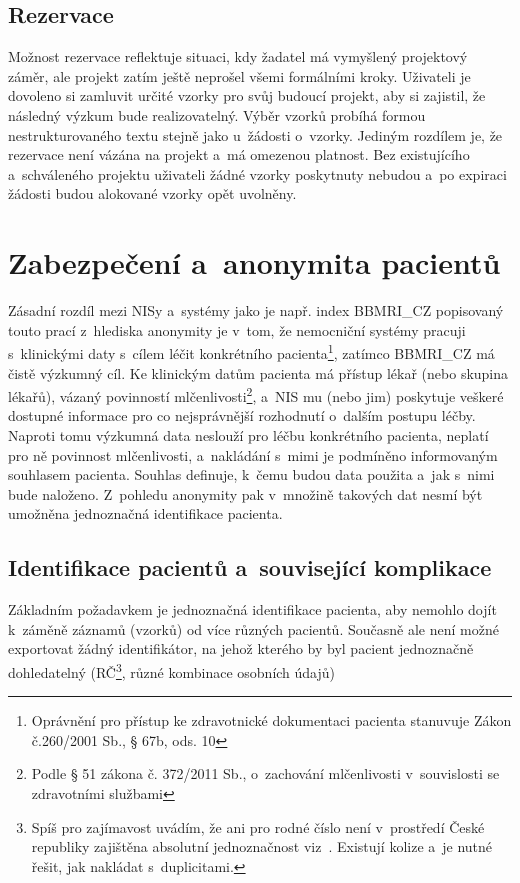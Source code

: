 \documentclass[11pt,draft,oneside]{fithesis2}
\newcommand{\ProjectName}{BBMRI\_CZ\xspace}
\begin{document}
\subsection{Rezervace}
Možnost rezervace reflektuje situaci, kdy žadatel má vymyšlený projektový záměr, ale projekt zatím ještě neprošel všemi formálními kroky. Uživateli je dovoleno si zamluvit určité vzorky pro svůj budoucí projekt, aby si zajistil, že následný výzkum bude realizovatelný. Výběr vzorků probíhá formou nestrukturovaného textu stejně jako u~žádosti o~vzorky. Jediným rozdílem je, že rezervace není vázána na projekt a~má omezenou platnost. Bez existujícího a~schváleného projektu uživateli žádné vzorky poskytnuty nebudou a~po expiraci žádosti budou alokované vzorky opět uvolněny.

\section{Zabezpečení a~anonymita pacientů}
Zásadní rozdíl mezi NISy a~systémy jako je např. index \ProjectName popisovaný touto prací z~hlediska anonymity je v~tom, že nemocniční systémy pracuji s~klinickými daty s~cílem léčit konkrétního pacienta\footnote{Oprávnění pro přístup ke zdravotnické dokumentaci pacienta stanuvuje Zákon č.260/2001 Sb., § 67b, ods. 10}, zatímco \ProjectName má čistě výzkumný cíl. Ke klinickým datům pacienta má přístup lékař (nebo skupina lékařů), vázaný povinností mlčenlivosti\footnote{Podle § 51 zákona č. 372/2011 Sb., o~zachování mlčenlivosti v~souvislosti se zdravotními službami}, a~NIS mu (nebo jim) poskytuje veškeré dostupné informace pro co nejsprávnější rozhodnutí o~dalším postupu léčby. Naproti tomu výzkumná data neslouží pro léčbu konkrétního pacienta, neplatí pro ně povinnost mlčenlivosti, a~nakládání s~mimi je podmíněno informovaným souhlasem pacienta. Souhlas definuje, k~čemu budou data použita a~jak s~nimi bude naloženo. Z~pohledu anonymity pak v~množině takových dat nesmí být umožněna jednoznačná identifikace pacienta.

\subsection{Identifikace pacientů a~související komplikace}
Základním požadavkem je jednoznačná identifikace pacienta, aby nemohlo dojít k~záměně záznamů (vzorků) od více různých pacientů. Současně ale není možné exportovat žádný identifikátor, na jehož kterého by byl pacient jednoznačně dohledatelný (RČ\footnote{Spíš pro zajímavost uvádím, že ani pro rodné číslo není v~prostředí České republiky zajištěna absolutní jednoznačnost viz~\cite{RodnaCisla}. Existují kolize a~je nutné řešit, jak nakládat s~duplicitami.}, různé kombinace osobních údajů)
\end{document}
